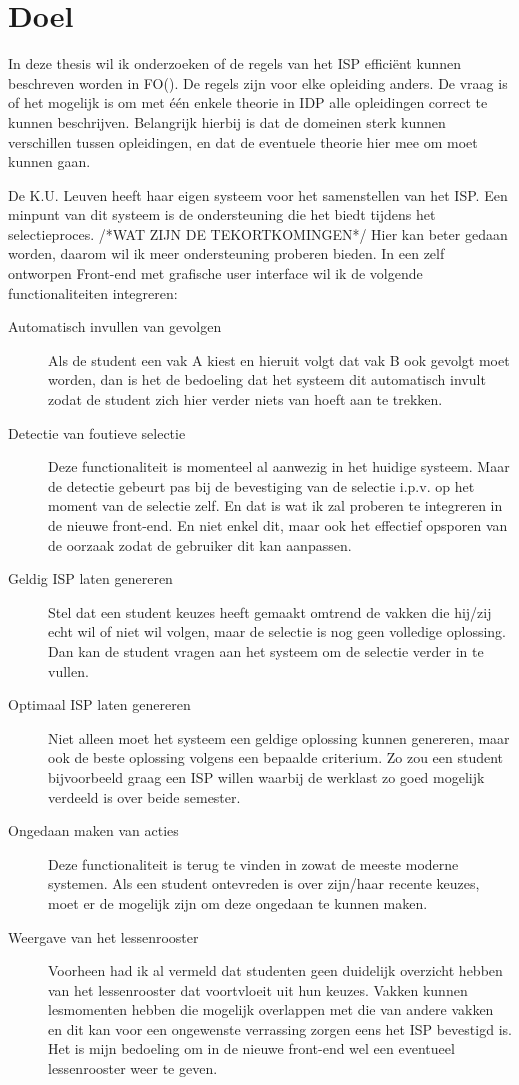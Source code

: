 \section{Doel}
In deze thesis wil ik onderzoeken of de regels van het ISP effici\"{e}nt kunnen beschreven worden in FO(\textperiodcentered). De regels zijn voor elke opleiding anders. De vraag is of het mogelijk is om met \'{e}\'{e}n enkele theorie in IDP alle opleidingen correct te kunnen beschrijven. Belangrijk hierbij is dat de domeinen sterk kunnen verschillen tussen opleidingen, en dat de eventuele theorie hier mee om moet kunnen gaan. 

De K.U. Leuven heeft haar eigen systeem voor het samenstellen van het ISP. Een minpunt van dit systeem is de ondersteuning die het biedt tijdens het selectieproces. /*WAT ZIJN DE TEKORTKOMINGEN*/ Hier kan beter gedaan worden, daarom wil ik meer ondersteuning proberen bieden. In een zelf ontworpen Front-end met grafische user interface wil ik de volgende functionaliteiten integreren:
\begin{description}
\item[Automatisch invullen van gevolgen] Als de student een vak A kiest en hieruit volgt dat vak B ook gevolgt moet worden, dan is het de bedoeling dat het systeem dit automatisch invult zodat de student zich hier verder niets van hoeft aan te trekken. 
\item[Detectie van foutieve selectie] Deze functionaliteit is momenteel al aanwezig in het huidige systeem. Maar de detectie gebeurt pas bij de bevestiging van de selectie i.p.v. op het moment van de selectie zelf. En dat is wat ik zal proberen te integreren in de nieuwe front-end. En niet enkel dit, maar ook het effectief opsporen van de oorzaak zodat de gebruiker dit kan aanpassen.
\item[Geldig ISP laten genereren] Stel dat een student keuzes heeft gemaakt omtrend de vakken die hij/zij echt wil of niet wil volgen, maar de selectie is nog geen volledige oplossing. Dan kan de student vragen aan het systeem om de selectie verder in te vullen.
\item[Optimaal ISP laten genereren] Niet alleen moet het systeem een geldige oplossing kunnen genereren, maar ook de beste oplossing volgens een bepaalde criterium. Zo zou een student bijvoorbeeld graag een ISP willen waarbij de werklast zo goed mogelijk verdeeld is over beide semester. 
\item[Ongedaan maken van acties] Deze functionaliteit is terug te vinden in zowat de meeste moderne systemen. Als een student ontevreden is over zijn/haar recente keuzes, moet er de mogelijk zijn om deze ongedaan te kunnen maken. 
\item[Weergave van het lessenrooster] Voorheen had ik al vermeld dat studenten geen duidelijk overzicht hebben van het lessenrooster dat voortvloeit uit hun keuzes. Vakken kunnen lesmomenten hebben die mogelijk overlappen met die van andere vakken en dit kan voor een ongewenste verrassing zorgen eens het ISP bevestigd is. Het is mijn bedoeling om in de nieuwe front-end wel een eventueel lessenrooster weer te geven.
\end{description}
